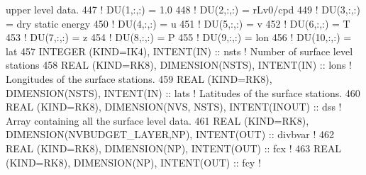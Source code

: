 \begin{DoxyCode}
{       upper level data.}
447                                                                                 \textcolor{comment}{! DU(1,:,:)   = 1.0}
448                                                                                 \textcolor{comment}{! DU(2,:,:)   = rLv0/cpd}
449                                                                                 \textcolor{comment}{! DU(3,:,:)   = dry static
       energy}
450                                                                                 \textcolor{comment}{! DU(4,:,:)   = u}
451                                                                                 \textcolor{comment}{! DU(5,:,:)   = v}
452                                                                                 \textcolor{comment}{! DU(6,:,:)   = T}
453                                                                                 \textcolor{comment}{! DU(7,:,:)   = z}
454                                                                                 \textcolor{comment}{! DU(8,:,:)   = P}
455                                                                                 \textcolor{comment}{! DU(9,:,:)   = lon}
456                                                                                 \textcolor{comment}{! DU(10,:,:)  = lat}
457 \textcolor{keywordtype}{INTEGER (KIND=IK4)}, \textcolor{keywordtype}{INTENT(IN)}                                      :: nsts     \textcolor{comment}{! Number of surface level
       stations}
458 \textcolor{keywordtype}{REAL (KIND=RK8)}, \textcolor{keywordtype}{DIMENSION(NSTS)}, \textcolor{keywordtype}{INTENT(IN)}                        :: lons     \textcolor{comment}{! Longitudes of the surface
       stations.}
459 \textcolor{keywordtype}{REAL (KIND=RK8)}, \textcolor{keywordtype}{DIMENSION(NSTS)}, \textcolor{keywordtype}{INTENT(IN)}                        :: lats     \textcolor{comment}{! Latitudes of the surface
       stations.}
460 \textcolor{keywordtype}{REAL (KIND=RK8)}, \textcolor{keywordtype}{DIMENSION(NVS, NSTS)}, \textcolor{keywordtype}{INTENT(INOUT)}                :: dss      \textcolor{comment}{! Array containing all the
       surface level data.}
461 \textcolor{keywordtype}{REAL (KIND=RK8)}, \textcolor{keywordtype}{DIMENSION(NVBUDGET\_LAYER,NP)}, \textcolor{keywordtype}{INTENT(OUT)}          :: divbvar  \textcolor{comment}{!}
462 \textcolor{keywordtype}{REAL (KIND=RK8)}, \textcolor{keywordtype}{DIMENSION(NP)}, \textcolor{keywordtype}{INTENT(OUT)}                         :: fcx      \textcolor{comment}{!}
463 \textcolor{keywordtype}{REAL (KIND=RK8)}, \textcolor{keywordtype}{DIMENSION(NP)}, \textcolor{keywordtype}{INTENT(OUT)}                         :: fcy      \textcolor{comment}{!}

\end{DoxyCode}
